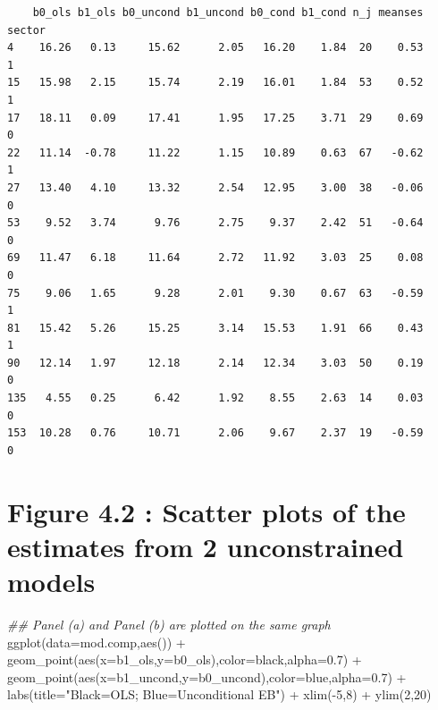 \documentclass[
  letterpaper,
  DIV=11,
  numbers=noendperiod]{scrreprt}
\newenvironment{Shaded}{\begin{snugshade}}{\end{snugshade}}
\newcommand{\AttributeTok}[1]{\textcolor[rgb]{0.49,0.56,0.16}{#1}}
\newcommand{\DecValTok}[1]{\textcolor[rgb]{0.25,0.63,0.44}{#1}}
\newcommand{\DocumentationTok}[1]{\textcolor[rgb]{0.73,0.13,0.13}{\textit{#1}}}
\newcommand{\FloatTok}[1]{\textcolor[rgb]{0.25,0.63,0.44}{#1}}
\newcommand{\FunctionTok}[1]{\textcolor[rgb]{0.02,0.16,0.49}{#1}}
\newcommand{\NormalTok}[1]{\textcolor[rgb]{0.00,0.44,0.13}{#1}}
\newcommand{\SpecialCharTok}[1]{\textcolor[rgb]{0.25,0.44,0.63}{#1}}
\newcommand{\StringTok}[1]{\textcolor[rgb]{0.25,0.44,0.63}{#1}}
\begin{document}
\begin{verbatim}
    b0_ols b1_ols b0_uncond b1_uncond b0_cond b1_cond n_j meanses sector
4    16.26   0.13     15.62      2.05   16.20    1.84  20    0.53      1
15   15.98   2.15     15.74      2.19   16.01    1.84  53    0.52      1
17   18.11   0.09     17.41      1.95   17.25    3.71  29    0.69      0
22   11.14  -0.78     11.22      1.15   10.89    0.63  67   -0.62      1
27   13.40   4.10     13.32      2.54   12.95    3.00  38   -0.06      0
53    9.52   3.74      9.76      2.75    9.37    2.42  51   -0.64      0
69   11.47   6.18     11.64      2.72   11.92    3.03  25    0.08      0
75    9.06   1.65      9.28      2.01    9.30    0.67  63   -0.59      1
81   15.42   5.26     15.25      3.14   15.53    1.91  66    0.43      1
90   12.14   1.97     12.18      2.14   12.34    3.03  50    0.19      0
135   4.55   0.25      6.42      1.92    8.55    2.63  14    0.03      0
153  10.28   0.76     10.71      2.06    9.67    2.37  19   -0.59      0
\end{verbatim}

\hypertarget{figure-4.2-scatter-plots-of-the-estimates-from-2-unconstrained-models}{%
\section{Figure 4.2 : Scatter plots of the estimates from 2
unconstrained
models}\label{figure-4.2-scatter-plots-of-the-estimates-from-2-unconstrained-models}}

\begin{Shaded}
\begin{Highlighting}[]
\DocumentationTok{\#\# Panel (a) and Panel (b) are plotted on the same graph }
\FunctionTok{ggplot}\NormalTok{(}\AttributeTok{data=}\NormalTok{mod.comp,}\FunctionTok{aes}\NormalTok{()) }\SpecialCharTok{+} 
  \FunctionTok{geom\_point}\NormalTok{(}\FunctionTok{aes}\NormalTok{(}\AttributeTok{x=}\NormalTok{b1\_ols,}\AttributeTok{y=}\NormalTok{b0\_ols),}\AttributeTok{color=}\StringTok{\textquotesingle{}black\textquotesingle{}}\NormalTok{,}\AttributeTok{alpha=}\FloatTok{0.7}\NormalTok{) }\SpecialCharTok{+} 
  \FunctionTok{geom\_point}\NormalTok{(}\FunctionTok{aes}\NormalTok{(}\AttributeTok{x=}\NormalTok{b1\_uncond,}\AttributeTok{y=}\NormalTok{b0\_uncond),}\AttributeTok{color=}\StringTok{\textquotesingle{}blue\textquotesingle{}}\NormalTok{,}\AttributeTok{alpha=}\FloatTok{0.7}\NormalTok{) }\SpecialCharTok{+} 
  \FunctionTok{labs}\NormalTok{(}\AttributeTok{title=}\StringTok{"Black=OLS; Blue=Unconditional EB"}\NormalTok{) }\SpecialCharTok{+}
  \FunctionTok{xlim}\NormalTok{(}\SpecialCharTok{{-}}\DecValTok{5}\NormalTok{,}\DecValTok{8}\NormalTok{) }\SpecialCharTok{+} \FunctionTok{ylim}\NormalTok{(}\DecValTok{2}\NormalTok{,}\DecValTok{20}\NormalTok{)}
\end{Highlighting}
\end{Shaded}
\end{document}
